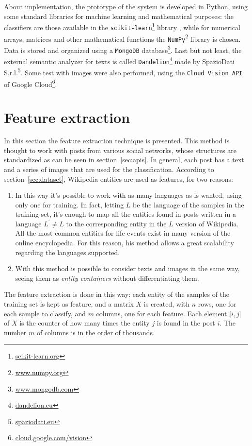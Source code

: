 About implementation, the prototype of the system is developed in Python, using some standard libraries for machine learning and mathematical purposes: the classifiers are those available in the \texttt{scikit-learn}\footnote{\url{scikit-learn.org}} library \cite{scikit-learn}, while for numerical arrays, matrices and other mathematical functions the \texttt{NumPy}\footnote{\url{www.numpy.org}} library \cite{oliphant2006guide} is chosen. Data is stored and organized using a \texttt{MongoDB} database\footnote{\url{www.mongodb.com}}. Last but not least, the external semantic analyzer for texts is called \texttt{Dandelion}\footnote{\url{dandelion.eu}} made by SpazioDati S.r.l.\footnote{\url{spaziodati.eu}}. Some test with images were also performed, using the \texttt{Cloud Vision API} of Google Cloud\footnote{\url{cloud.google.com/vision}}.

\section{Feature extraction}
\label{sec:featurextraction}
In this section the feature extraction technique is presented. This method is thought to work with posts from various social networks, whose structures are standardized as can be seen in section~\ref{sec:apis}. In general, each post has a text and a series of images that are used for the classification. According to section~\ref{sec:dataset}, Wikipedia entities are used as features, for two reasons:
\begin{enumerate}
\item In this way it's possible to work with as many languages as is wanted, using only one for training. In fact, letting $ L $ be the language of the samples in the training set, it's enough to map all the entities found in posts written in a language $ L^{'} \ne L $ to the corresponding entity in the $ L $ version of Wikipedia. All the most common entities for life events exist in many version of the online encyclopedia. For this reason, his method allows a great scalability regarding the languages supported.
\item With this method is possible to consider texts and images in the same way, seeing them as \emph{entity containers} without differentiating them.
\end{enumerate}

The feature extraction is done in this way: each entity of the samples of the training set is kept as feature, and a matrix $X$ is created, with $n$ rows, one for each sample to classify, and $m$ columns, one for each feature. Each element [$i,j$] of $X$ is the counter of how many times the entity $j$ is found in the post $i$. The number $m$ of columns is in the order of thousands.

